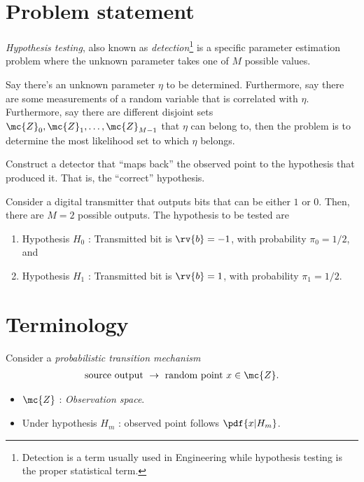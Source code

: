 \section{Problem statement}
\emph{Hypothesis testing}, also known as \emph{detection}\footnote{Detection is a term usually used in Engineering while hypothesis testing is the proper statistical term.} is a specific parameter estimation problem where the unknown parameter takes one of $M$ possible values.

Say there's an unknown parameter $\eta$ to be determined. Furthermore, say there are some measurements of a random variable that is correlated with $\eta$. Furthermore, say there are different disjoint sets $\mc{Z}_{0}, \mc{Z}_{1},\ldots, \mc{Z}_{M-1}$ that $\eta$ can belong to, then the problem is to determine the most likelihood set to which $\eta$ belongs.

\begin{myBlackBox}
    Construct a detector that ``maps back'' the observed point to the hypothesis that produced it. That is, the ``correct'' hypothesis. 
\end{myBlackBox}

\begin{example}
    Consider a digital transmitter that outputs bits that can be either $1$ or $0$. Then, there are $M=2$ possible outputs. The hypothesis to be tested are
    \begin{enumerate}
        \item Hypothesis $H_{0}$ : Transmitted bit is $\rv{b} = -1$, with probability $\pi_{0}=1/2$, and
        \item Hypothesis $H_{1}$ : Transmitted bit is $\rv{b} = 1$, with probability $\pi_{1} = 1/2$.
    \end{enumerate}
\end{example}

\section{Terminology}
Consider a \emph{probabilistic transition mechanism}
\begin{align}
    \text{source output } \to \text{ random point } x \in \mc{Z}.
\end{align}
\begin{itemize}
    \item $\mc{Z}$ : \emph{Observation space}.
    \item Under hypothesis $H_{m}$ : observed point follows $\pdf{x|H_{m}}$.
\end{itemize}
